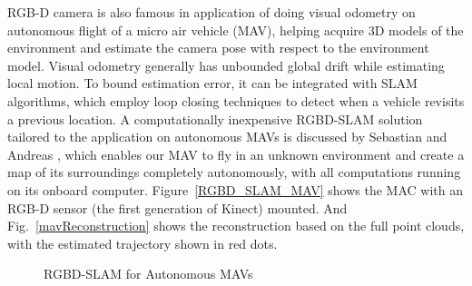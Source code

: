 %
RGB-D camera is also famous in application of doing visual odometry on autonomous flight of a micro air vehicle (MAV), helping acquire 3D models of the environment and estimate the camera pose with respect to the environment model. Visual odometry generally has unbounded global drift while estimating local motion. To bound estimation error, it can be integrated with SLAM algorithms, which employ loop closing techniques to detect when a vehicle revisits a previous location. A computationally inexpensive RGBD-SLAM solution tailored to the application on autonomous MAVs is discussed by Sebastian and Andreas \cite{RGBDSLAMmav_2013}, which enables our MAV to fly in an unknown environment and create a map of its surroundings completely autonomously, with all computations running on its onboard computer. Figure~\ref{RGBD_SLAM_MAV} shows the MAC with an RGB-D sensor (the first generation of Kinect) mounted. And Fig.~\ref{mavReconstruction} shows the reconstruction based on the full point clouds, with the estimated trajectory shown in red dots. 
%
\\\indent
%
\begin{figure}[t]
\centering
{}
\caption{RGBD-SLAM for Autonomous MAVs \cite{RGBDSLAMmav_2013}}
\label{autoRGBD_SLAM_MAV}
\end{figure}%
